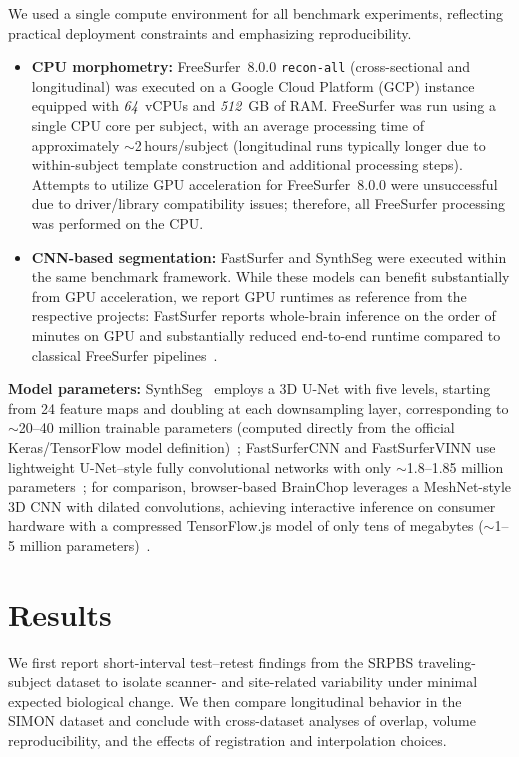 \documentclass{midl} %
\begin{document}
We used a single compute environment for all benchmark experiments, reflecting practical deployment constraints and emphasizing reproducibility.
\begin{itemize}
    \item \textbf{CPU morphometry:} FreeSurfer~8.0.0 \texttt{recon-all} (cross-sectional and longitudinal) was executed on a Google Cloud Platform (GCP) instance equipped with \textit{64}~vCPUs and \textit{512}~GB of RAM. FreeSurfer was run using a single CPU core per subject, with an average processing time of approximately $\sim$2\,hours/subject (longitudinal runs typically longer due to within-subject template construction and additional processing steps). Attempts to utilize GPU acceleration for FreeSurfer~8.0.0 were unsuccessful due to driver/library compatibility issues; therefore, all FreeSurfer processing was performed on the CPU.
    \item \textbf{CNN-based segmentation:} FastSurfer and SynthSeg were executed within the same benchmark framework. While these models can benefit substantially from GPU acceleration, we report GPU runtimes as reference from the respective projects: FastSurfer reports whole-brain inference on the order of minutes on GPU and substantially reduced end-to-end runtime compared to classical FreeSurfer pipelines~\citep{FastSurferGitHub}.
\end{itemize}

\textbf{Model parameters:} SynthSeg~\citep{SynthSegGitHubRuntime} employs a 3D U-Net with five levels, starting from 24 feature maps and doubling at each downsampling layer, corresponding to $\sim$20--40 million trainable parameters (computed directly from the official Keras/TensorFlow model definition)~\citep{Billot2023SynthSeg}; FastSurferCNN and FastSurferVINN use lightweight U-Net--style fully convolutional networks with only $\sim$1.8--1.85 million parameters~\citep{henschel2022fastsurfervinn}; for comparison, browser-based BrainChop leverages a MeshNet-style 3D CNN with dilated convolutions, achieving interactive inference on consumer hardware with a compressed TensorFlow.js model of only tens of megabytes ($\sim$1--5 million parameters)~\citep{BrainChopJOSS}.

\section{Results}

We first report short-interval test--retest findings from the SRPBS traveling-subject dataset to isolate scanner- and site-related variability under minimal expected biological change. We then compare longitudinal behavior in the SIMON dataset and conclude with cross-dataset analyses of overlap, volume reproducibility, and the effects of registration and interpolation choices.
\end{document}

